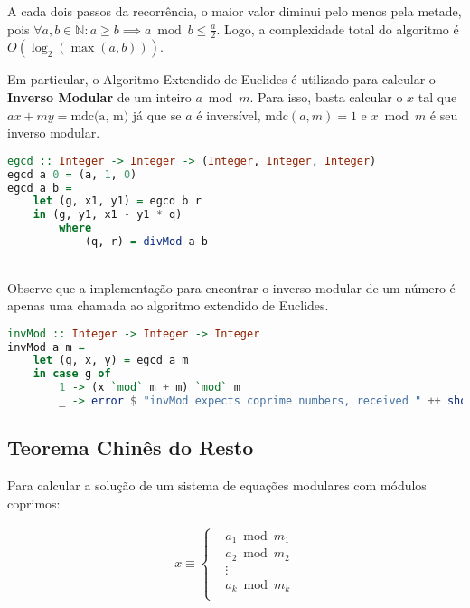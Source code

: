 \documentclass{article}
\begin{document}
A cada dois passos da recorrência, o maior valor diminui pelo menos pela metade, pois $\forall a, b \in \mathbb{N} \colon a \geq b \implies a \bmod b \leq \frac{a}{2}$. Logo, a complexidade total do algoritmo é $O(\log_2(\max (a, b)))$.

Em particular, o Algoritmo Extendido de Euclides é utilizado para calcular o \textbf{Inverso Modular} de um inteiro $a \bmod m$. Para isso, basta calcular o $x$ tal que $ax + my = \text{mdc(a, m)}$ já que se $a$ é inversível, $\text{mdc}(a, m) = 1$ e $x \bmod m$ é seu inverso modular.


\begin{minipage}{.9\linewidth}
\begin{lstlisting}[language=haskell,caption=Algoritmo Extendido de Euclides]
egcd :: Integer -> Integer -> (Integer, Integer, Integer)
egcd a 0 = (a, 1, 0)
egcd a b =
    let (g, x1, y1) = egcd b r
    in (g, y1, x1 - y1 * q)
        where
            (q, r) = divMod a b
\end{lstlisting}
\end{minipage} \\
Observe que a implementação para encontrar o inverso modular de um número é apenas uma chamada ao algoritmo extendido de Euclides.

\begin{minipage}{.9\linewidth}
\begin{lstlisting}[language=haskell,caption=Inverso Modular]
invMod :: Integer -> Integer -> Integer
invMod a m =
    let (g, x, y) = egcd a m
    in case g of
        1 -> (x `mod` m + m) `mod` m
        _ -> error $ "invMod expects coprime numbers, received " ++ show a ++ " " ++ show m
\end{lstlisting}
\end{minipage}

\subsection{Teorema Chinês do Resto}

Para calcular a solução de um sistema de equações modulares com módulos coprimos:

\begin{align*}
  x \equiv \begin{cases}
    &a_1 \bmod m_1 \\
    &a_2 \bmod m_2 \\
    &\vdots \\
    &a_k \bmod m_k \\
\end{cases}
\end{align*}
\end{document}
